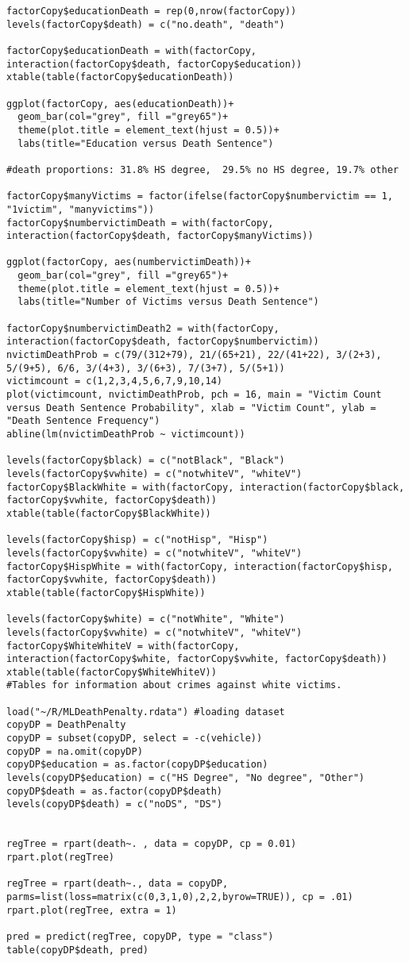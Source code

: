 \documentclass{article}
\begin{document}
\begin{verbatim}
factorCopy$educationDeath = rep(0,nrow(factorCopy))
levels(factorCopy$death) = c("no.death", "death")

factorCopy$educationDeath = with(factorCopy, interaction(factorCopy$death, factorCopy$education))
xtable(table(factorCopy$educationDeath))

ggplot(factorCopy, aes(educationDeath))+
  geom_bar(col="grey", fill ="grey65")+
  theme(plot.title = element_text(hjust = 0.5))+
  labs(title="Education versus Death Sentence")

#death proportions: 31.8% HS degree,  29.5% no HS degree, 19.7% other

factorCopy$manyVictims = factor(ifelse(factorCopy$numbervictim == 1, "1victim", "manyvictims"))
factorCopy$numbervictimDeath = with(factorCopy, interaction(factorCopy$death, factorCopy$manyVictims))

ggplot(factorCopy, aes(numbervictimDeath))+
  geom_bar(col="grey", fill ="grey65")+
  theme(plot.title = element_text(hjust = 0.5))+
  labs(title="Number of Victims versus Death Sentence")

factorCopy$numbervictimDeath2 = with(factorCopy, interaction(factorCopy$death, factorCopy$numbervictim))
nvictimDeathProb = c(79/(312+79), 21/(65+21), 22/(41+22), 3/(2+3), 5/(9+5), 6/6, 3/(4+3), 3/(6+3), 7/(3+7), 5/(5+1))
victimcount = c(1,2,3,4,5,6,7,9,10,14)
plot(victimcount, nvictimDeathProb, pch = 16, main = "Victim Count versus Death Sentence Probability", xlab = "Victim Count", ylab = "Death Sentence Frequency")
abline(lm(nvictimDeathProb ~ victimcount))

levels(factorCopy$black) = c("notBlack", "Black")
levels(factorCopy$vwhite) = c("notwhiteV", "whiteV")
factorCopy$BlackWhite = with(factorCopy, interaction(factorCopy$black, factorCopy$vwhite, factorCopy$death))
xtable(table(factorCopy$BlackWhite))

levels(factorCopy$hisp) = c("notHisp", "Hisp")
levels(factorCopy$vwhite) = c("notwhiteV", "whiteV")
factorCopy$HispWhite = with(factorCopy, interaction(factorCopy$hisp, factorCopy$vwhite, factorCopy$death))
xtable(table(factorCopy$HispWhite))

levels(factorCopy$white) = c("notWhite", "White")
levels(factorCopy$vwhite) = c("notwhiteV", "whiteV")
factorCopy$WhiteWhiteV = with(factorCopy, interaction(factorCopy$white, factorCopy$vwhite, factorCopy$death))
xtable(table(factorCopy$WhiteWhiteV))
#Tables for information about crimes against white victims. 

load("~/R/MLDeathPenalty.rdata") #loading dataset
copyDP = DeathPenalty
copyDP = subset(copyDP, select = -c(vehicle))
copyDP = na.omit(copyDP)
copyDP$education = as.factor(copyDP$education)
levels(copyDP$education) = c("HS Degree", "No degree", "Other")
copyDP$death = as.factor(copyDP$death)
levels(copyDP$death) = c("noDS", "DS")


regTree = rpart(death~. , data = copyDP, cp = 0.01)
rpart.plot(regTree)

regTree = rpart(death~., data = copyDP, parms=list(loss=matrix(c(0,3,1,0),2,2,byrow=TRUE)), cp = .01)
rpart.plot(regTree, extra = 1)

pred = predict(regTree, copyDP, type = "class")
table(copyDP$death, pred)



\end{verbatim}
\end{document}
